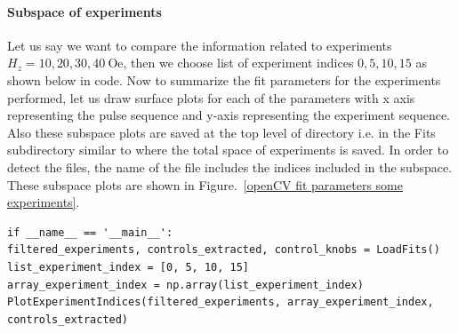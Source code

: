 \documentclass[12pt, twoside, a4paper]{article}
\begin{document}
\paragraph{Subspace of experiments}
Let us say we want to compare the information related to experiments $H_{z} = 10, 20, 30, 40~\mathrm{Oe}$, then we choose list of experiment indices $0, 5, 10, 15$ as shown below in code. Now to summarize the fit parameters for the experiments performed, let us draw surface plots for each of the parameters with x axis representing the pulse sequence and y-axis representing the experiment sequence. Also these subspace plots are saved at the top level of directory i.e. in the Fits subdirectory similar to where the total space of experiments is saved. In order to detect the files, the name of the file includes the indices included in the subspace. These subspace plots are shown in Figure.~\ref{openCV fit parameters some experiments}.
%
\begin{verbatim}
if __name__ == '__main__':
filtered_experiments, controls_extracted, control_knobs = LoadFits()
list_experiment_index = [0, 5, 10, 15]
array_experiment_index = np.array(list_experiment_index)
PlotExperimentIndices(filtered_experiments, array_experiment_index, controls_extracted)
\end{verbatim}
%
%
\end{document}
